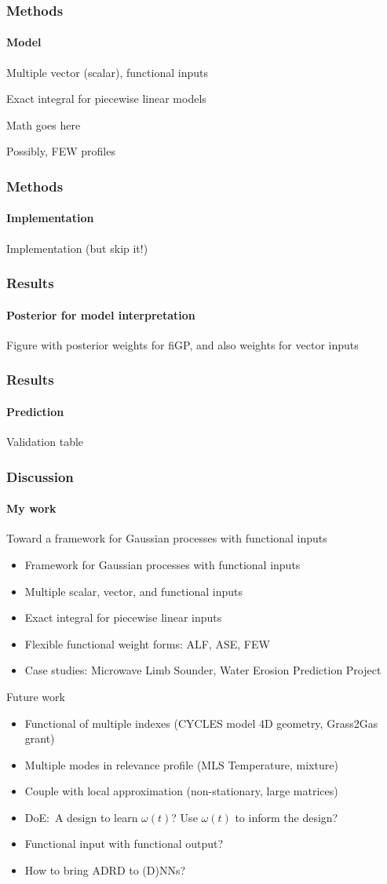 \documentclass{snedecorbeamer}
\begin{document}
\begin{frame}
  \frametitle{Methods}
  \framesubtitle{Model}

  Multiple vector (scalar), functional inputs

  Exact integral for piecewise linear models

  Math goes here

  Possibly, FEW profiles
\end{frame}

\begin{frame}
  \frametitle{Methods}
  \framesubtitle{Implementation}

  Implementation (but skip it!)
\end{frame}

\begin{frame}
  \frametitle{Results}
  \framesubtitle{Posterior for model interpretation}

  Figure with posterior weights for fiGP, and also weights for vector inputs
\end{frame}

\begin{frame}
  \frametitle{Results}
  \framesubtitle{Prediction}

  Validation table
\end{frame}

\begin{frame}
  \frametitle{Discussion}
  \framesubtitle{My work}

  Toward a framework for Gaussian processes with functional inputs
  \begin{itemize}
  \item Framework for Gaussian processes with functional inputs
  \item Multiple scalar, vector, and functional inputs
  \item Exact integral for piecewise linear inputs
  \item Flexible functional weight forms: ALF, ASE, FEW
  \item Case studies: Microwave Limb Sounder, Water Erosion Prediction Project
  \end{itemize}
  \vspace{3ex}
  Future work
  \begin{itemize}
  \item Functional of multiple indexes (CYCLES model 4D geometry, Grass2Gas
    grant)
  \item Multiple modes in relevance profile (MLS Temperature, mixture)
  \item Couple with local approximation (non-stationary, large matrices)
  \item DoE:~A design to learn $\omega(t)$? Use $\omega(t)$ to inform the
design?
  \item Functional input with functional output?
  \item How to bring ADRD to (D)NNs?
  \end{itemize}
\end{frame}
\end{document}
